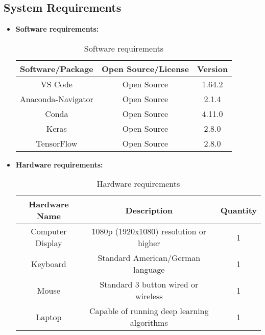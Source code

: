\subsection{System Requirements }

\begin{itemize}
	
	\item \textbf {Software requirements:}
	
	\begin{table}[h]
		\centering
		\caption{Software requirements}
		\label{tab:Software requirements}
		\begin{tabular}{|c|c|c|}
			\hline
			\textbf{Software/Package} & \textbf{Open Source/License} & \textbf{Version}\\
			\hline
			VS Code & Open Source & 1.64.2\\
			\hline
			Anaconda-Navigator & Open Source & 2.1.4\\
			\hline
			Conda & Open Source & 4.11.0\\
			\hline
			Keras & Open Source & 2.8.0\\
			\hline
			TensorFlow & Open Source & 2.8.0\\
			\hline
		\end{tabular}
	\end{table}


\item \textbf {Hardware requirements:}


\begin{table}[h]
	\centering
	\caption{Hardware requirements}
	\label{tab:Hardware requirementss}
	\begin{tabular}{|c|c|c|}
		\hline
		\textbf{Hardware Name} & \textbf{Description} & \textbf{Quantity}\\
		\hline
		Computer Display & 1080p (1920x1080) resolution or higher & 1\\
		\hline
		Keyboard & Standard American/German language & 1\\
		\hline
		Mouse & Standard 3 button wired or wireless & 1\\
		\hline
		Laptop & Capable of running deep learning algorithms & 1\\
		\hline
	\end{tabular}
\end{table}

\end{itemize}
